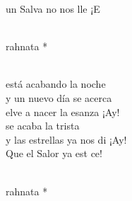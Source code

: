 \documentclass[12pt]{article}
\begin{document}
\begin{multicols*}{2}
\begin{cancion}
	 un Salva no nos lle ¡E\\\jump\\
	\begin{chorus}%
	rahnata *\\
	\end{chorus}%
	\jump\\
	 está acabando la noche\\
y un nuevo día se acerca\\
	elve a nacer la esanza ¡Ay!\\
	se acaba la trista\\
	y las estrellas ya nos di ¡Ay!\\
	Que el Salor ya est ce!\\\jump\\
	\begin{chorus}%
	rahnata *\\
	\end{chorus}%
	\jump\\
\end{cancion}%


\end{multicols*}
\end{document}

